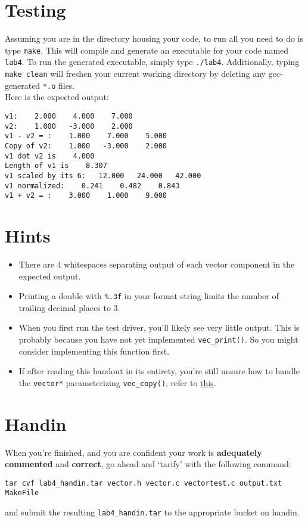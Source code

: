 \documentclass[12pt]{article}
\begin{document}
\section{Testing}

Assuming you are in the directory housing your code, to run all you need to do is type \texttt{make}. This will compile and generate an executable for your code named \texttt{lab4}. To run the generated executable, simply type \texttt{./lab4}. Additionally, typing \texttt{make clean} will freshen your current working directory by deleting any gcc-generated \texttt{*.o} files. \\

\noindent Here is the expected output:

\begin{mdframed}[backgroundcolor=light-gray, innerleftmargin=10, innertopmargin=1,innerbottommargin=1,linecolor=light-gray]
\begin{lstlisting}
v1:    2.000    4.000    7.000
v2:    1.000   -3.000    2.000
v1 - v2 = :    1.000    7.000    5.000
Copy of v2:    1.000   -3.000    2.000
v1 dot v2 is    4.000 
Length of v1 is    8.307 
v1 scaled by its 6:   12.000   24.000   42.000
v1 normalized:    0.241    0.482    0.843
v1 + v2 = :    3.000    1.000    9.000
\end{lstlisting}
\end{mdframed} 

\section{Hints}
\begin{itemize}
\item There are 4 whitespaces separating output of each vector component in the expected output.
\item Printing a double with \texttt{\%.3f} in your format string limits the number of trailing decimal places to 3.
\item When you first run the test driver, you'll likely see very little output. This is probably because you have not yet implemented \texttt{vec\_print()}. So you might consider implementing this function first.
\item If after reading this handout in its entirety, you're still unsure how to handle the \texttt{vector*} parameterizing \texttt{vec\_copy()}, refer to \href{http://www.cs.usfca.edu/~wolber/SoftwareDev/C/CStructs.htm}{this}.
\end{itemize}

\section{Handin}

When you're finished, and you are confident your work is \textbf{adequately commented} and \textbf{correct}, go ahead and `tarify' with the following command:
\begin{center}
\texttt{tar cvf lab4\_handin.tar vector.h vector.c vectortest.c output.txt MakeFile}
\end{center}
\noindent and submit the resulting \texttt{lab4\_handin.tar} to the appropriate bucket on handin.
\end{document}
